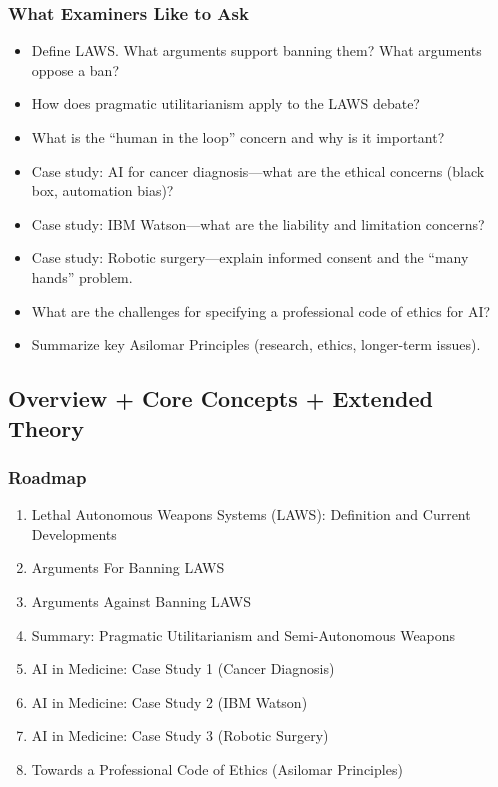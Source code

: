 \separator

\subsubsection*{What Examiners Like to Ask}

\begin{itemize}
  \item Define LAWS. What arguments support banning them? What arguments oppose a ban?
  \item How does pragmatic utilitarianism apply to the LAWS debate?
  \item What is the ``human in the loop'' concern and why is it important?
  \item Case study: AI for cancer diagnosis---what are the ethical concerns (black box, automation bias)?
  \item Case study: IBM Watson---what are the liability and limitation concerns?
  \item Case study: Robotic surgery---explain informed consent and the ``many hands'' problem.
  \item What are the challenges for specifying a professional code of ethics for AI?
  \item Summarize key Asilomar Principles (research, ethics, longer-term issues).
\end{itemize}

\bigseparator

\subsection{Overview + Core Concepts + Extended Theory}

\subsubsection*{Roadmap}
\begin{enumerate}
  \item Lethal Autonomous Weapons Systems (LAWS): Definition and Current Developments
  \item Arguments For Banning LAWS
  \item Arguments Against Banning LAWS
  \item Summary: Pragmatic Utilitarianism and Semi-Autonomous Weapons
  \item AI in Medicine: Case Study 1 (Cancer Diagnosis)
  \item AI in Medicine: Case Study 2 (IBM Watson)
  \item AI in Medicine: Case Study 3 (Robotic Surgery)
  \item Towards a Professional Code of Ethics (Asilomar Principles)
\end{enumerate}

